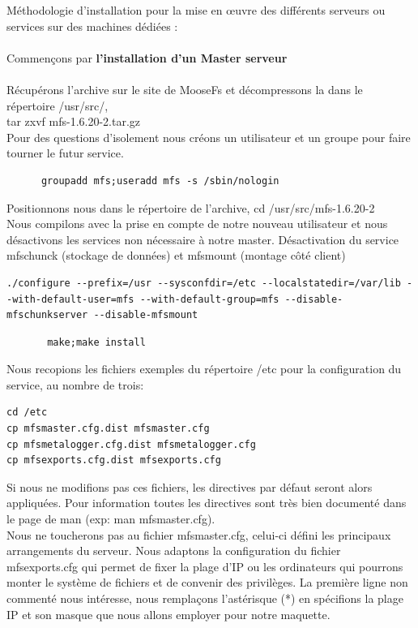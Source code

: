 \documentclass[12pt]{report}
\begin{document}
Méthodologie d'installation pour la mise en œuvre des différents serveurs ou services sur des machines dédiées :\\\\
Commençons par \textbf{l'installation d'un Master serveur}\\\\
Récupérons l'archive sur le site de MooseFs et décompressons la dans le répertoire /usr/src/,\\ tar zxvf mfs-1.6.20-2.tar.gz\\
Pour des questions d'isolement nous créons un utilisateur et un groupe pour faire tourner le futur service.\\
\begin{lstlisting}
	  groupadd mfs;useradd mfs -s /sbin/nologin
	  \end{lstlisting}
Positionnons nous dans le répertoire de l'archive, cd /usr/src/mfs-1.6.20-2\\
Nous compilons avec la prise en compte de notre nouveau utilisateur et nous désactivons les services non nécessaire à notre master.
Désactivation du service mfschunck (stockage de données) et mfsmount (montage côté client)
\begin{lstlisting}
./configure --prefix=/usr --sysconfdir=/etc --localstatedir=/var/lib --with-default-user=mfs --with-default-group=mfs --disable-mfschunkserver --disable-mfsmount
	  \end{lstlisting}
\begin{lstlisting}
	   make;make install
	  \end{lstlisting}
Nous recopions les fichiers exemples du répertoire /etc pour la configuration du service, au nombre de trois:
\begin{lstlisting}
cd /etc
cp mfsmaster.cfg.dist mfsmaster.cfg
cp mfsmetalogger.cfg.dist mfsmetalogger.cfg
cp mfsexports.cfg.dist mfsexports.cfg
	  \end{lstlisting}
Si nous ne modifions pas ces fichiers, les directives par défaut seront alors appliquées.
Pour information toutes les directives sont très bien documenté dans le page de man (exp: man mfsmaster.cfg).\\
Nous ne toucherons pas au fichier mfsmaster.cfg, celui-ci défini les principaux arrangements du serveur.
Nous adaptons la configuration du fichier mfsexports.cfg qui permet de fixer la plage d'IP ou les ordinateurs qui pourrons monter le système de fichiers et de convenir des privilèges.
La première ligne non commenté nous intéresse, nous remplaçons l'astérisque (*) en spécifions la plage IP et son masque que nous allons employer pour notre maquette.
\end{document}
